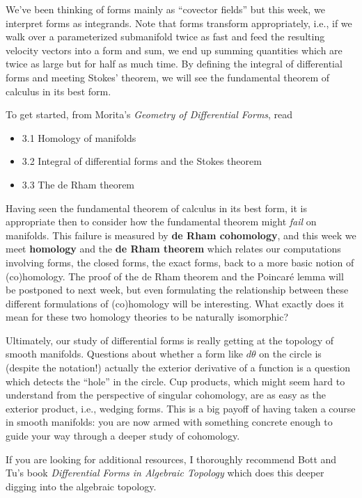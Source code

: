 \documentclass{homework}
\author{Jim Fowler}
\date{Week 7: Homology and cohomology}
\begin{document}
\maketitle

We've been thinking of forms mainly as ``covector fields'' but this
week, we interpret forms as integrands.  Note that forms transform
appropriately, i.e., if we walk over a parameterized submanifold twice
as fast and feed the resulting velocity vectors into a form and sum,
we end up summing quantities which are twice as large but for half as
much time.  By defining the integral of differential forms and meeting
Stokes' theorem, we will see the fundamental theorem of calculus in
its best form.

To get started, from Morita's \textit{Geometry of Differential Forms}, read
\begin{itemize}
\item 3.1 Homology of manifolds
\item 3.2 Integral of differential forms and the Stokes theorem
\item 3.3 The de Rham theorem
\end{itemize} Having seen the fundamental theorem of calculus in its
best form, it is appropriate then to consider how the fundamental
theorem might \textit{fail} on manifolds.  This failure is measured by
\textbf{de Rham cohomology}, and this week we meet \textbf{homology}
and the \textbf{de Rham theorem} which relates our computations
involving forms, the closed forms, the exact forms, back to a more
basic notion of (co)homology.  The proof of the de Rham theorem and
the Poincar\'e lemma will be postponed to next week, but even
formulating the relationship between these different formulations of
(co)homology will be interesting.  What exactly does it mean for these
two homology theories to be naturally isomorphic?

Ultimately, our study of differential forms is really getting at the
topology of smooth manifolds.  Questions about whether a form like
$d\theta$ on the circle is (despite the notation!) actually the
exterior derivative of a function is a question which detects the
``hole'' in the circle.  Cup products, which might seem hard to
understand from the perspective of singular cohomology, are as easy as
the exterior product, i.e., wedging forms.  This is a big payoff of
having taken a course in smooth manifolds: you are now armed with
something concrete enough to guide your way through a deeper study of
cohomology.

If you are looking for additional resources, I thoroughly recommend
Bott and Tu's book \textit{Differential Forms in Algebraic Topology}
which does this deeper digging into the algebraic topology.
\end{document}
